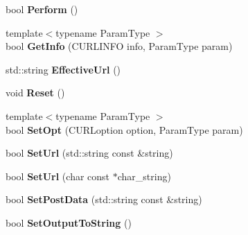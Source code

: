 \begin{DoxyCompactItemize}
\item 
\hypertarget{classlsf_1_1asio_1_1Curl_ade7623ef7dc11a5db7eb8a20a80a8d8f}{
bool {\bfseries Perform} ()}
\label{classlsf_1_1asio_1_1Curl_ade7623ef7dc11a5db7eb8a20a80a8d8f}

\item 
\hypertarget{classlsf_1_1asio_1_1Curl_a3d50e7ffb3fdf3443f1381ce0f914441}{
{\footnotesize template$<$typename ParamType $>$ }\\bool {\bfseries GetInfo} (CURLINFO info, ParamType param)}
\label{classlsf_1_1asio_1_1Curl_a3d50e7ffb3fdf3443f1381ce0f914441}

\item 
\hypertarget{classlsf_1_1asio_1_1Curl_adc89355ab0051ef2ef9a5fe2e16887af}{
std::string {\bfseries EffectiveUrl} ()}
\label{classlsf_1_1asio_1_1Curl_adc89355ab0051ef2ef9a5fe2e16887af}

\item 
\hypertarget{classlsf_1_1asio_1_1Curl_a059a8877fd24810c5f92c6168ab1616a}{
void {\bfseries Reset} ()}
\label{classlsf_1_1asio_1_1Curl_a059a8877fd24810c5f92c6168ab1616a}

\item 
\hypertarget{classlsf_1_1asio_1_1Curl_a36847d73bd03e0c1975eef1dd24e4290}{
{\footnotesize template$<$typename ParamType $>$ }\\bool {\bfseries SetOpt} (CURLoption option, ParamType param)}
\label{classlsf_1_1asio_1_1Curl_a36847d73bd03e0c1975eef1dd24e4290}

\item 
\hypertarget{classlsf_1_1asio_1_1Curl_a7f9118d5d596e60bfb686265e1120c32}{
bool {\bfseries SetUrl} (std::string const \&string)}
\label{classlsf_1_1asio_1_1Curl_a7f9118d5d596e60bfb686265e1120c32}

\item 
\hypertarget{classlsf_1_1asio_1_1Curl_a4bbcfa94138999f9cd5455dcb80e194d}{
bool {\bfseries SetUrl} (char const $\ast$char\_\-string)}
\label{classlsf_1_1asio_1_1Curl_a4bbcfa94138999f9cd5455dcb80e194d}

\item 
\hypertarget{classlsf_1_1asio_1_1Curl_a51d9f1bd48f6a6e684a3e20cf9009d8f}{
bool {\bfseries SetPostData} (std::string const \&string)}
\label{classlsf_1_1asio_1_1Curl_a51d9f1bd48f6a6e684a3e20cf9009d8f}

\item 
\hypertarget{classlsf_1_1asio_1_1Curl_a46efd95fb1d609aca516f99e1810ef85}{
bool {\bfseries SetOutputToString} ()}
\label{classlsf_1_1asio_1_1Curl_a46efd95fb1d609aca516f99e1810ef85}


\end{DoxyCompactItemize}
